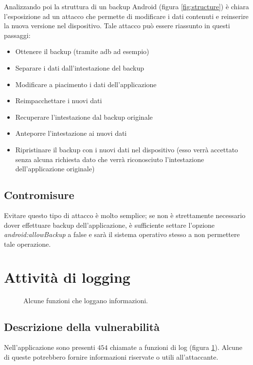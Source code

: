 Analizzando poi la struttura di un backup Android (figura \ref{fig:structure}) è chiara l'esposizione ad un attacco che permette di modificare i dati contenuti e reinserire la nuova versione nel dispositivo. Tale attacco può essere riassunto in questi passaggi:

\begin{itemize}
	\item Ottenere il backup (tramite adb ad esempio)
	\item Separare i dati dall'intestazione del backup
	\item Modificare a piacimento i dati dell'applicazione
	\item Reimpacchettare i nuovi dati
	\item Recuperare l'intestazione dal backup originale
	\item Anteporre l'intestazione ai nuovi dati
	\item Ripristinare il backup  con i nuovi dati nel dispositivo (esso verrà accettato senza alcuna richiesta dato che verrà riconosciuto l'intestazione dell'applicazione originale)
\end{itemize}

\subsection{Contromisure}

Evitare questo tipo di attacco è molto semplice; se non è strettamente necessario dover effettuare backup dell'applicazione, è sufficiente settare l'opzione \emph{android:allowBackup} a false e sarà il sistema operativo stesso a non permettere tale operazione.

\section{Attività di logging}

\begin{figure}[h]
	\centering 
	\caption{Alcune funzioni che loggano informazioni.}
	\label{fig:log}
\end{figure}

\subsection{Descrizione della vulnerabilità}

Nell'applicazione sono presenti $454$ chiamate a funzioni di log (figura \ref{fig:log}). Alcune di queste potrebbero fornire informazioni riservate o utili all'attaccante.

